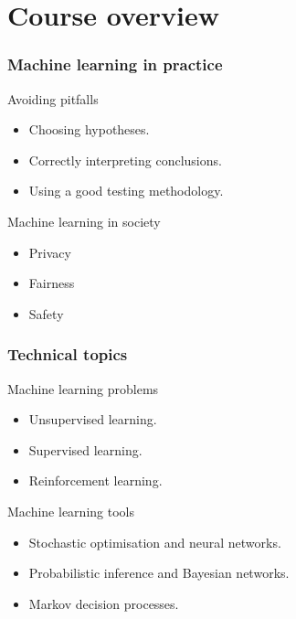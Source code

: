 \section{Course overview}

\begin{frame}
  \frametitle{Machine learning in practice}
  \begin{block}{Avoiding pitfalls}
    \begin{itemize}
    \item Choosing hypotheses.
    \item Correctly interpreting conclusions.
    \item Using a good testing methodology.
    \end{itemize}
  \end{block}
  \begin{block}{Machine learning in society}
    \begin{itemize}
    \item<alert@2> Privacy 
    \item<alert@3> Fairness 
    \item<alert@4> Safety 
    \end{itemize}
  \end{block}
\end{frame}


\begin{frame}
  \frametitle{Technical topics}

  \begin{block}{Machine learning problems}
    \begin{itemize}
    \item Unsupervised learning.
    \item Supervised learning.
    \item Reinforcement learning.
    \end{itemize}
  \end{block}

  \begin{block}{Machine learning tools}
    \begin{itemize}
    \item Stochastic optimisation and neural networks.
    \item Probabilistic inference and Bayesian networks.
    \item Markov decision processes.
    \end{itemize}
  \end{block}
\end{frame}

